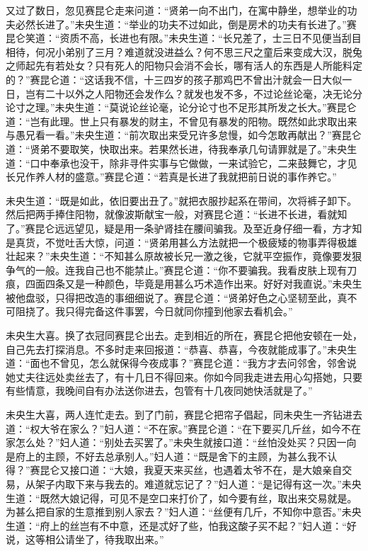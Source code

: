\documentclass[a4paper,12pt,UTF8,twoside]{ctexbook}
\begin{document}
又过了数日，忽见赛昆仑走来问道：“贤弟一向不出门，在寓中静坐，想举业的功夫必然长进了。”未央生道：“举业的功夫不过如此，倒是房术的功夫有长进了。”赛昆仑笑道：“资质不高，长进也有限。”未央生道：“长兄差了，士三日不见便当刮目相待，何况小弟别了三月？难道就没进益么？何不思三尺之童后来变成大汉，脱兔之师起先有若处女？只有死人的阳物只会消不会长，哪有活人的东西是人所能料定的？”赛昆仑道：“这话我不信，十三四岁的孩子那鸡巴不曾出汁就会一日大似一日，岂有二十以外之人阳物还会发作么？就发也发不多，不过论丝论毫，决无论分论寸之理。”未央生道：“莫说论丝论毫，论分论寸也不足形其所发之长大。”赛昆仑道：“岂有此理。世上只有暴发的财主，不曾见有暴发的阳物。既然如此求取出来与愚兄看一看。”未央生道：“前次取出来受兄许多怠慢，如今怎敢再献出？”赛昆仑道：“贤弟不要取笑，快取出来。若果然长进，待我奉承几句请罪就是了。”未央生道：“口中奉承也没干，除非寻件实事与它做做，一来试验它，二来鼓舞它，才见长兄作养人材的盛意。”赛昆仑道：“若真是长进了我就把前日说的事作养它。”

未央生道：“既是如此，依旧要出丑了。”就把衣服抄起系在带间，次将裤子卸下。然后把两手捧住阳物，就像波斯献宝一般，对赛昆仑道：“长进不长进，看就知了。”赛昆仑远远望见，疑是用一条驴肾挂在腰间骗我。及至近身仔细一看，方才知是真货，不觉吐舌大惊，问道：“贤弟用甚么方法就把一个极疲矮的物事弄得极雄壮起来？”未央生道：“不知甚么原故被长兄一激之後，它就平空振作，竟像要发狠争气的一般。连我自己也不能禁止。”赛昆仑道：“你不要骗我。我看皮肤上现有刀痕，四面四条又是一种颜色，毕竟是用甚么巧术造作出来。好好对我直说。”未央生被他盘驳，只得把改造的事细细说了。赛昆仑道：“贤弟好色之心坚韧至此，真不可阻挠了。我只得完备这件事罢，今日就同你撞到他家去看机会。”

未央生大喜。换了衣冠同赛昆仑出去。走到相近的所在，赛昆仑把他安顿在一处，自己先去打探消息。不多时走来回报道：“恭喜、恭喜，今夜就能成事了。”未央生道：“面也不曾见，怎么就保得今夜成事？”赛昆仑道：“我方才去问邻舍，邻舍说她丈夫往远处卖丝去了，有十几日不得回来。你如今同我走进去用心勾搭她，只要有些情意，我晚间自有办法送你进去，包管有十几夜同她快活就是了。”

未央生大喜，两人连忙走去。到了门前，赛昆仑把帘子倡起，同未央生一齐钻进去道：“权大爷在家么？”妇人道：“不在家。”赛昆仑道：“在下要买几斤丝，如今不在家怎么处？”妇人道：“别处去买罢了。”未央生就接口道：“丝怕没处买？只因一向是府上的主顾，不好去总承别人。”妇人道：“既是舍下的主顾，为甚么我不认得？”赛昆仑又接口道：“大娘，我夏天来买丝，也遇着太爷不在，是大娘亲自交易，从架子内取下来与我去的。难道就忘记了？”妇人道：“是记得有这一次。”未央生道：“既然大娘记得，可见不是空口来打价了，如今要有丝，取出来交易就是。为甚么把自家的生意推到别人家去？”妇人道：“丝便有几斤，不知你中意否。”未央生道：“府上的丝岂有不中意，还是忒好了些，怕我这酸子买不起？”妇人道：“好说，这等相公请坐了，待我取出来。”
\end{document}
